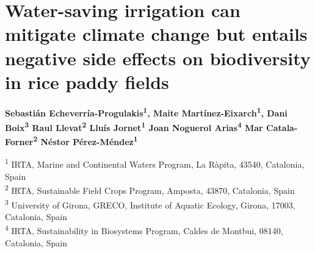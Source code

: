 \chapter{Water-saving irrigation can mitigate climate change but entails negative side effects on biodiversity in rice paddy fields}
\label{Chapter1}

\begin{center}
\textbf{
Sebastián Echeverría-Progulakis\textsuperscript{1},
Maite Martínez-Eixarch\textsuperscript{1},
Dani Boix\textsuperscript{3}
Raul Llevat\textsuperscript{2}
Lluís Jornet\textsuperscript{1}
Joan Noguerol Arias\textsuperscript{4}
Mar Catala-Forner\textsuperscript{2}
Néstor Pérez-Méndez\textsuperscript{1}
}
\end{center}

\vspace{1ex}

\begin{center}
\textsuperscript{1} IRTA, Marine and Continental Waters Program, La Ràpita, 43540, Catalonia, Spain \\
\textsuperscript{2} IRTA, Sustainable Field Crops Program, Amposta, 43870, Catalonia, Spain  \\
\textsuperscript{3} University of Girona, GRECO, Institute of Aquatic Ecology, Girona, 17003, Catalonia, Spain\\
\textsuperscript{4} IRTA, Sustainability in Biosystems Program, Caldes de Montbui, 08140, Catalonia, Spain
\end{center}
%
%
%
%
%
%            
%
%

